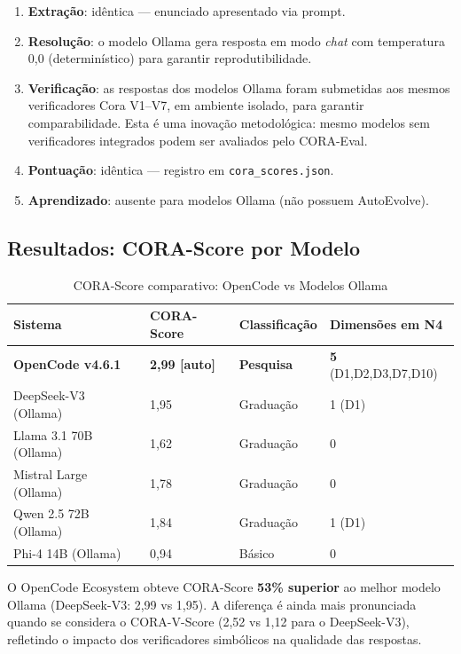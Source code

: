 \begin{enumerate}[label=(\roman*)]
\item \textbf{Extração}: idêntica — enunciado apresentado via prompt.
\item \textbf{Resolução}: o modelo Ollama gera resposta em modo \textit{chat}
      com temperatura 0,0 (determinístico) para garantir reprodutibilidade.
\item \textbf{Verificação}: as respostas dos modelos Ollama foram submetidas
      aos mesmos verificadores Cora V1--V7, em ambiente isolado, para garantir
      comparabilidade. Esta é uma inovação metodológica: mesmo modelos sem
      verificadores integrados podem ser avaliados pelo CORA-Eval.
\item \textbf{Pontuação}: idêntica — registro em \texttt{cora\_scores.json}.
\item \textbf{Aprendizado}: ausente para modelos Ollama (não possuem
      AutoEvolve).
\end{enumerate}

\subsection{Resultados: CORA-Score por Modelo}

\begin{table}[H]\centering
\caption{CORA-Score comparativo: OpenCode vs Modelos Ollama}
\label{tab:cora_comparison}
\begin{tabular}{p{}p{}p{}p{}}
\toprule
\textbf{Sistema} & \textbf{CORA-Score} & \textbf{Classificação} & \textbf{Dimensões em N4} \\
\midrule
\textbf{OpenCode v4.6.1} & \textbf{2,99 [auto]} & \textbf{Pesquisa} & \textbf{5} (D1,D2,D3,D7,D10) \\
DeepSeek-V3 (Ollama) & 1,95 & Graduação & 1 (D1) \\
Llama 3.1 70B (Ollama) & 1,62 & Graduação & 0 \\
Mistral Large (Ollama) & 1,78 & Graduação & 0 \\
Qwen 2.5 72B (Ollama) & 1,84 & Graduação & 1 (D1) \\
Phi-4 14B (Ollama) & 0,94 & Básico & 0 \\
\bottomrule
\end{tabular}
\end{table}

O OpenCode Ecosystem obteve CORA-Score \textbf{53\% superior} ao melhor modelo
Ollama (DeepSeek-V3: 2,99 vs 1,95). A diferença é ainda mais pronunciada
quando se considera o CORA-V-Score (2,52 vs 1,12 para o DeepSeek-V3),
refletindo o impacto dos verificadores simbólicos na qualidade das respostas.

